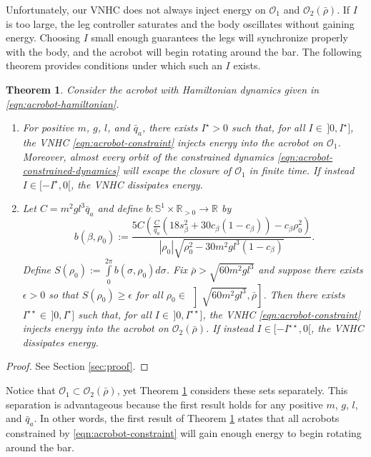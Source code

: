 \documentclass[journal,twoside,onecolumn,draftclsnofoot,web]{ieeecolor}
\newtheorem{thm}{Theorem}%
\newcommand*{\R}{\mathbb{R}}
\newcommand*{\Sone}{\mathbb{S}^1}
\newcommand*{\SxR}{\Sone \times \R}
\begin{document}
{Unfortunately, our VNHC does not always inject energy on \(\mathcal{O}_1\) and
\(\mathcal{O}_2(\bar{\rho})\).
If \(I\) is too large, the leg controller saturates and the body oscillates
without gaining energy.
Choosing \(I\) small enough guarantees the legs will synchronize
properly with the body, and the acrobot will begin rotating around the bar.
The following theorem provides conditions under which such an \(I\) exists.

\begin{thm}\label{thm:acrobot-energy-stabilization}
    Consider the acrobot with Hamiltonian dynamics given in
    \eqref{eqn:acrobot-hamiltonian}.
\begin{enumerate}
    \item For positive \(m\), \(g\), \(l\), and \(\bar{q}_a\), there exists
        \(I^\star > 0\) such that, for all \(I \in \, ]0,I^\star]\), the VNHC
        \eqref{eqn:acrobot-constraint} injects energy into the acrobot on
        \(\mathcal{O}_1\).
        Moreover, almost every orbit of the constrained dynamics 
        \eqref{eqn:acrobot-constrained-dynamics} will escape the closure of
        \(\mathcal{O}_1\) in finite time.
        If instead \(I \in [-I^\star,0[\), the VNHC dissipates energy.
    \item Let \(C = m^2gl^3\bar{q}_a\) and 
        define \(b : \SxR_{> 0} \rightarrow \R\) by
    \[
        b(\beta,\rho_0) := 
        \frac{5C \left(
        \frac{C}{\bar{q}_a}\left(18s_\beta^2 + 30c_\beta(1 - c_\beta)\right)
            - c_\beta\rho_0^2
        \right)}{
        |\rho_0|\sqrt{\rho_0^2 - 30m^2gl^3(1 - c_\beta)}
        }
        .
    \]
        Define 
        \(S(\rho_0) := \int \limits_{0}^{2\pi} b(\sigma,\rho_0)d\sigma\).
        Fix \(\bar{\rho} > \sqrt{60m^2gl^3}\) and
        suppose there exists \(\epsilon > 0\) so that 
        \(S(\rho_0) \geq \epsilon\) for all 
        \(\rho_0 \in \, \left]\sqrt{60m^2gl^3}, \bar{\rho}\right]\).
        Then there exists \(I^{\star\star} \in \, ]0, I^\star]\) such that, for all 
        \(I \in \, ]0,I^{\star\star}]\), the VNHC
        \eqref{eqn:acrobot-constraint} injects energy into the acrobot on
        \(\mathcal{O}_2(\bar{\rho})\).
        If instead \(I \in [-I^{\star\star},0[\), the VNHC dissipates energy.
\end{enumerate}
\end{thm}
\begin{proof}
    See Section \ref{sec:proof}.
\end{proof}

Notice that \(\mathcal{O}_1 \subset \mathcal{O}_2(\bar{\rho})\), yet
Theorem \ref{thm:acrobot-energy-stabilization} considers these sets separately.
This separation is advantageous because the first result holds for any positive
\(m\), \(g\), \(l\), and \(\bar{q}_a\). 
In other words, the first result of Theorem
\ref{thm:acrobot-energy-stabilization} states that all acrobots constrained by
\eqref{eqn:acrobot-constraint} will gain enough energy to begin rotating around
the bar.

}
\end{document}
